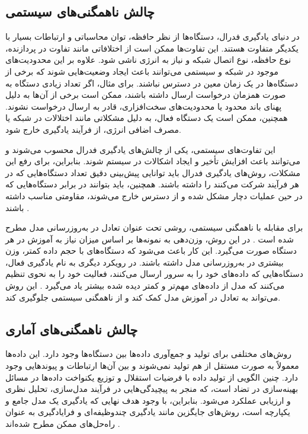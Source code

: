 \subsection{
	چالش ناهمگنی‌های سیستمی%
}
در دنیای یادگیری فدرال، دستگاه‌ها از نظر حافظه، توان محاسباتی و ارتباطات بسیار با یکدیگر متفاوت هستند. این تفاوت‌ها ممکن است از اختلافاتی مانند تفاوت در پردازنده، نوع حافظه، نوع اتصال شبکه و نیاز به انرژی ناشی شود. علاوه بر این محدودیت‌های موجود در شبکه و سیستمی می‌توانند باعث ایجاد وضعیت‌هایی شوند که برخی از دستگاه‌ها در یک زمان معین در دسترس نباشند. برای مثال، اگر تعداد زیادی دستگاه به صورت همزمان درخواست ارسال داشته باشند، ممکن است برخی از آن‌ها به دلیل پهنای باند محدود یا محدودیت‌های سخت‌افزاری، قادر به ارسال درخواست نشوند. همچنین، ممکن است یک دستگاه فعال، به دلیل مشکلاتی مانند اختلالات در شبکه یا مصرف اضافی انرژی، از فرآیند یادگیری خارج شود.

این تفاوت‌های سیستمی، یکی از چالش‌های یادگیری فدرال محسوب می‌شوند و می‌توانند باعث افزایش تأخیر و ایجاد اشکالات در سیستم شوند. بنابراین، برای رفع این مشکلات، روش‌های یادگیری فدرال باید توانایی پیش‌بینی دقیق تعداد دستگاه‌هایی که در هر فرآیند شرکت می‌کنند را داشته باشند. همچنین، باید بتوانند در برابر دستگاه‌هایی که در حین عملیات دچار مشکل شده و از دسترس خارج می‌شوند، مقاومتی مناسب داشته باشند
\cite{li2020federated}.


برای مقابله با ناهمگنی سیستمی، روشی تحت عنوان تعادل در به‌روزرسانی مدل مطرح شده است
\cite{konevcny2015federated}.
در این روش، وزن‌دهی به نمونه‌ها بر اساس میزان نیاز به آموزش در هر دستگاه صورت می‌گیرد. این کار باعث می‌شود که دستگاه‌های با حجم داده کمتر، وزن بیشتری در به‌روزرسانی مدل داشته باشند.
در رویکرد دیگری به نام یادگیری فعال، دستگاه‌هایی که داده‌های خود را به سرور ارسال می‌کنند، فعالیت خود را به نحوی تنظیم می‌کنند که مدل از داده‌های مهم‌تر و کمتر دیده شده بیشتر یاد می‌گیرد
\cite{konevcny2016federated}.
این روش می‌تواند به تعادل در آموزش مدل کمک کند و از ناهمگنی سیستمی جلوگیری کند.


\subsection{
	چالش ناهمگنی‌های آماری%
}
روش‌های مختلفی برای تولید و جمع‌آوری داده‌ها بین دستگاه‌ها وجود دارد. این داده‌ها معمولاً به صورت مستقل از هم تولید نمی‌شوند و بین آن‌ها ارتباطات و پیوندهایی وجود دارد. چنین الگویی از تولید داده با فرضیات استقلال و توزیع یکنواخت داده‌ها
در مسائل بهینه‌سازی در تضاد است، که منجر به پیچیدگی‌هایی در فرآیند مدل‌سازی، تحلیل نظری و ارزیابی عملکرد می‌شود. بنابراین، با وجود هدف نهایی که یادگیری یک مدل جامع و یکپارچه است، روش‌های جایگزین مانند یادگیری چندوظیفه‌ای%
و فرایادگیری%
به عنوان راه‌حل‌های ممکن مطرح شده‌اند
\cite{li2020federated}.



